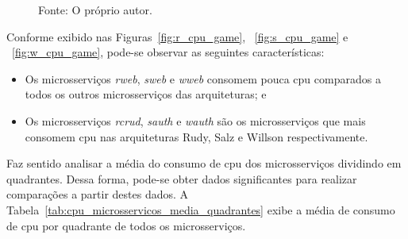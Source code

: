 \begin{figure}[htb!]
    Fonte: O próprio autor.
\end{figure}

Conforme exibido nas Figuras~\ref{fig:r_cpu_game}, ~\ref{fig:s_cpu_game} e ~\ref{fig:w_cpu_game}, pode-se observar as seguintes características:

\begin{itemize}
 \item Os microsserviços \textit{rweb}, \textit{sweb} e \textit{wweb} consomem pouca \ac{cpu} comparados a todos os outros microsserviços das arquiteturas; e
 \item Os microsserviços \textit{rcrud}, \textit{sauth} e \textit{wauth} são os microsserviços que mais consomem \ac{cpu} nas arquiteturas Rudy, Salz e Willson respectivamente.
\end{itemize}

Faz sentido analisar a média do consumo de \ac{cpu} dos microsserviços dividindo em quadrantes.
%
Dessa forma, pode-se obter dados significantes para realizar comparações a partir destes dados.
%
A Tabela~\ref{tab:cpu_microsservicos_media_quadrantes} exibe a média de consumo de \ac{cpu} por quadrante de todos os microsserviços.

